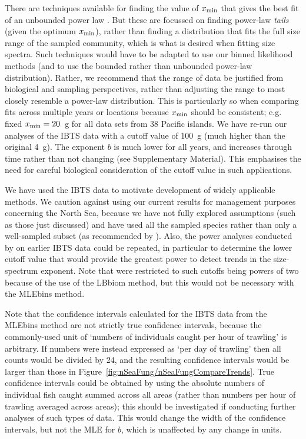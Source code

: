 There are techniques available for finding the value of $x_{\mathrm{min}}$ that gives the
best fit of an unbounded power law \citep{csn09, gilles15}.
But these are focussed on finding power-law \emph{tails} (given the optimum
$x_{\mathrm{min}}$), rather than finding a distribution that fits the full size range of
the sampled community, which is what is desired when fitting size spectra.
Such techniques would have to be adapted to use our binned likelihood methods (and to
use the bounded rather than unbounded power-law distribution).
Rather, we recommend that the range
of data be justified from biological and sampling perspectives, rather than adjusting
the range to most closely resemble a power-law distribution. This is particularly
so when comparing fits across multiple years or locations because $x_{\mathrm{min}}$ should be
consistent; e.g.~\citet{robins17} fixed $x_{\mathrm{min}} = 20$~g for all data sets from 38
Pacific islands.
We have re-run our analyses of the IBTS data with a
cutoff value of 100~g (much higher than the original 4~g). The
exponent $b$ is much lower for all years, and increases through time rather than not
changing (see Supplementary Material). This emphasises the need for careful
biological consideration of the cutoff value in such applications.

We have used the IBTS data to motivate development of widely applicable
methods. We caution against using our current results for management purposes
concerning the North Sea, because we have not fully explored assumptions (such
as those just discussed) and have used all the sampled species rather than only
a well-sampled subset (as recommended by \citealt{jd05}). Also, the power
analyses conducted by \citet{jd05} on earlier IBTS data could be repeated, in
particular to determine the lower cutoff value that would provide the greatest
power to detect trends in the size-spectrum exponent. Note that \citet{jd05}
were restricted to such cutoffs being powers of two because of the use of the
LBbiom method, but this would not be necessary with the MLEbins method.


Note that the confidence intervals calculated for the IBTS data
from the MLEbins method
are not strictly true confidence intervals, because the commonly-used unit of `numbers
of individuals caught per hour of trawling' is arbitrary. If numbers were
instead expressed as `per day of trawling' then all counts would be divided by
24, and
the resulting confidence intervals would be larger than those in
Figure~\ref{fig:nSeaFung/nSeaFungCompareTrends}.
True confidence intervals could be obtained by using the absolute numbers of
individual fish caught summed across all areas (rather than numbers per hour of
trawling averaged across areas); this should be investigated if conducting
further analyses of such types of data.
This would change the width of the confidence intervals, but not the MLE for
$b$, which is unaffected by any change in units.

